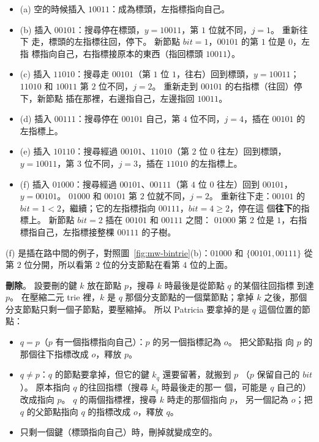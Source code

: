 \begin{itemize}
\item (a) 空的時候插入 $10011$：成為標頭，左指標指向自己。
\item (b) 插入 $00101$：搜尋停在標頭，$y = 10011$，第 $1$ 位就不同，$j = 1$。 重新往下
走，標頭的左指標往回，停下。 新節點 $\mathit{bit} = 1$，$00101$ 的第 $1$ 位是 $0$，左指
標指向自己，右指標接原本的東西（指回標頭 $10011$）。
\item (c) 插入 $11010$：搜尋走 $00101$（第 $1$ 位 $1$，往右）回到標頭，$y = 10011$；
$11010$ 和 $10011$ 第 $2$ 位不同，$j = 2$。 重新走到 $00101$ 的右指標（往回）停下，新節點
插在那裡，右邊指自己，左邊指回 $10011$。
\item (d) 插入 $00111$：搜尋停在 $00101$ 自己，第 $4$ 位不同，$j = 4$，插在 $00101$ 的
左指標上。
\item (e) 插入 $10110$：搜尋經過 $00101$、$11010$（第 $2$ 位 $0$ 往左）回到標頭，
$y = 10011$，第 $3$ 位不同，$j = 3$，插在 $11010$ 的左指標上。
\item (f) 插入 $01000$：搜尋經過 $00101$、$00111$（第 $4$ 位 $0$ 往左）回到 $00101$，
$y = 00101$。 $01000$ 和 $00101$ 第 $2$ 位就不同，$j = 2$。 重新往下走：$00101$ 的
$\mathit{bit} = 1 < 2$，繼續；它的左指標指向 $00111$，$\mathit{bit} = 4 \ge 2$，停在這
個\textbf{往下}的指標上。 新節點 $\mathit{bit} = 2$ 插在 $00101$ 和 $00111$ 之間：
$01000$ 第 $2$ 位是 $1$，右指標指自己，左指標接整棵 $00111$ 的子樹。
\end{itemize}

(f) 是插在路中間的例子，對照圖~\ref{fig:mw-bintrie}(b)：$01000$ 和 $\{00101, 00111\}$ 從
第 $2$ 位分開，所以看第 $2$ 位的分支節點在看第 $4$ 位的上面。

\textbf{刪除}。 設要刪的鍵 $k$ 放在節點 $p$，搜尋 $k$ 時最後是從節點 $q$ 的某個往回指標
到達 $p$。 在壓縮二元 trie 裡，$k$ 是 $q$ 那個分支節點的一個葉節點；拿掉 $k$ 之後，那個
分支節點只剩一個子節點，要壓縮掉。 所以 Patricia 要拿掉的是 $q$ 這個位置的節點：
\begin{itemize}
\item \textbf{$q = p$}（$p$ 有一個指標指向自己）：$p$ 的另一個指標記為 $o$。 把父節點指
向 $p$ 的那個往下指標改成 $o$，釋放 $p$。
\item \textbf{$q \ne p$}：$q$ 的節點要拿掉，但它的鍵 $k_q$ 還要留著，就搬到 $p$
（$p$ 保留自己的 $\mathit{bit}$）。 原本指向 $q$ 的往回指標（搜尋 $k_q$ 時最後走的那一
個，可能是 $q$ 自己的）改成指向 $p$。 $q$ 的兩個指標裡，搜尋 $k$ 時走的那個指向 $p$，
另一個記為 $o$；把 $q$ 的父節點指向 $q$ 的指標改成 $o$，釋放 $q$。
\item 只剩一個鍵（標頭指向自己）時，刪掉就變成空的。
\end{itemize}

